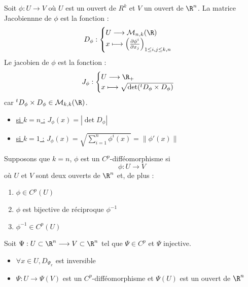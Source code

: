 \begin{definition}
    Soit $ \phi : U \rightarrow V$ où $U$ est un ouvert de $R^k$ et $V$ un ouvert de $\R^n$. La matrice Jacobiennne de $\phi$ est la fonction :
        \[ D_\phi :
            \begin{cases}
                U \longrightarrow \mathcal{M}_{n,k}(\R) \\
                x \longmapsto \Bigl( \frac{\partial \phi ^i}{\partial x_j} \Bigr) _{1 \leq i,j \leq k,n}
            \end{cases} \] 
    Le jacobien de $\phi$ est la fonction :
        \[ J_\phi :
            \begin{cases}
                U \longrightarrow \R_+ \\ 
                x \longmapsto \sqrt{\det (^t D_\phi \times D_\phi)}
            \end{cases}
        \]
        car $^t D_\phi \times D_\phi \in \mathcal{M}_{k,k}(\R)$.
    \begin{itemize}
        \item \underline{si $k = n$ :} $ \boxed{J_\phi(x) = | \det D_\phi |} $
        \item \underline{si $ k =1$ :} $ J_\phi(x) = \sqrt{\sum_{i=1}^{n} \phi^{i}(x)} = \| \phi'(x) \|$  
    \end{itemize}
\end{definition}

\begin{definition}[$C^p$-difféomorphisme]
    Supposons que $k=n$, $\phi$ est un $C^p$-difféomorphisme si 
    \[ \phi : U \longrightarrow V \]
    où $U$ et $V$ sont deux ouverts de $\R^n$ et, de plus :
    \begin{enumerate}
        \item $\phi \in C^p(U)$ 
        \item $\phi$ est bijective de réciproque $\phi^{-1}$
        \item $\phi^{-1} \in C^p(U)$ 
    \end{enumerate}
\end{definition}

\begin{theorem}
    Soit $\Psi : U \subset \R^n \longrightarrow V \subset \R^n$ tel que $\Psi \in C^p$ et $\Psi$ injective. 
    \begin{itemize}
        \item[\underline{si}] $ \forall x \in U, D_{\Psi_x}$ est inversible
        \item[\underline{alors}]  $\Psi : U \longrightarrow \Psi(V)$ est un $C^p$-difféomorphisme et $\Psi(U)$ est un ouvert de $\R^n$
    \end{itemize}
\end{theorem}


